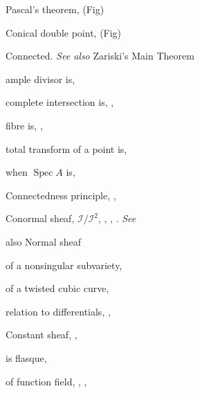 {{\noindent\hspace*{7.5bp}Pascal's theorem,  (Fig)\par
\noindent\hspace*{0.0bp}Conical double point,  (Fig)\par
\noindent\hspace*{0.0bp}Connected. \emph{See also} Zariski's Main Theorem\par
\noindent\hspace*{7.5bp}ample divisor is, \par
\noindent\hspace*{7.5bp}complete intersection is, , \par
\noindent\hspace*{7.5bp}fibre is, , \par
\noindent\hspace*{7.5bp}total transform of a point is, \par
\noindent\hspace*{7.5bp}when $\operatorname{Spec}A$ is, \par
\noindent\hspace*{0.0bp}Connectedness principle, , \par
\noindent\hspace*{0.0bp}Conormal sheaf, $\mathcal I/\mathcal I^2$, , , . \emph{See}\par
\noindent\hspace*{15.0bp}also Normal sheaf\par
\noindent\hspace*{7.5bp}of a nonsingular subvariety, \par
\noindent\hspace*{7.5bp}of a twisted cubic curve, \par
\noindent\hspace*{7.5bp}relation to differentials, , \par
\noindent\hspace*{0.0bp}Constant sheaf, , \par
\noindent\hspace*{7.5bp}is flasque, \par
\noindent\hspace*{7.5bp}of function field, , , \par
}}
